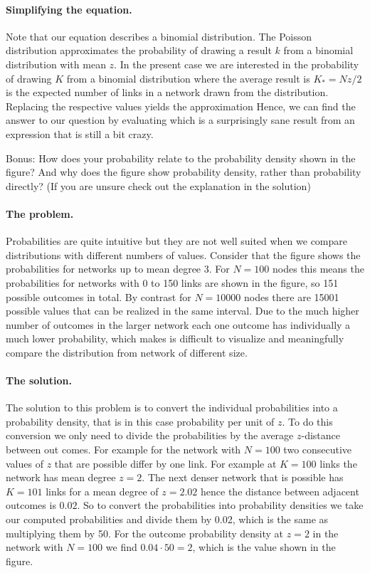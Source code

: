 \paragraph{Simplifying the equation.}Note that our equation describes a binomial distribution. 
The Poisson distribution 
approximates the probability of drawing a result $k$ from a binomial distribution with mean $z$. In the present case we are interested in the probability of drawing $K$ from a binomial distribution where the average result is $K_*=Nz/2$ is the expected number of links in a network drawn from the distribution. Replacing the respective values yields the approximation 
Hence, we can find the answer to our question by evaluating 
which is a surprisingly sane result from an expression that is still a bit crazy. 

\subquestion Bonus: How does your probability relate to the probability density shown in the figure? And why does the figure show probability density, rather than probability directly? (If you are unsure check out the explanation in the solution) 

\solution

\paragraph{The problem.}Probabilities are quite intuitive but they are not well suited when we compare distributions with different numbers of values. Consider that the figure shows the probabilities for networks up to mean degree 3. For $N=100$ nodes this means the probabilities for networks with 0 to 150 links are shown in the figure, so 151 possible outcomes in total. By contrast for $N=10000$ nodes there are 15001 possible values that can be realized in the same interval. Due to the much higher number of outcomes in the larger network each one outcome has individually a much lower probability, which makes is difficult to visualize and meaningfully compare the distribution from network of different size. 

\paragraph{The solution.}The solution to this problem is to convert the individual probabilities into a probability density, that is in this case probability per unit of $z$. To do this conversion we only need to divide the probabilities by the average $z$-distance between out comes. For example for the network with $N=100$ two consecutive values of $z$ that are possible differ by one link. For example at $K=100$ links the network has mean degree $z=2$. The next denser network that is possible has $K=101$ links for a mean degree  of $z=2.02$ hence the distance between adjacent outcomes is $0.02$. So to convert the probabilities into probability densities we take our computed probabilities and divide them by 0.02, which is the same as multiplying them by 50. For the outcome probability density at $z=2$ in the network with $N=100$ we find $0.04\cdot 50 = 2$, which is the value shown in the figure. 

